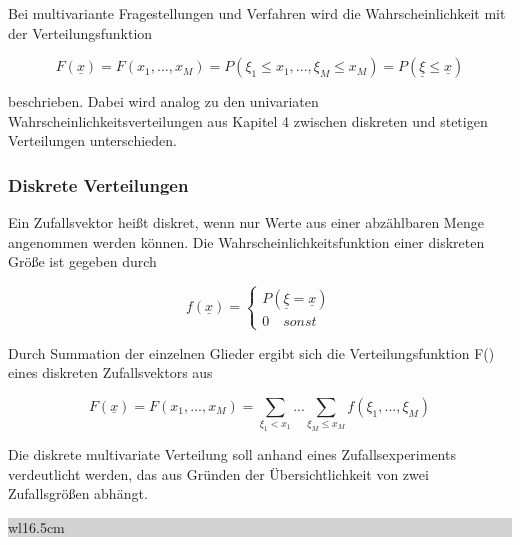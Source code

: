 \noindent Bei multivariante Fragestellungen und Verfahren wird die Wahrscheinlichkeit mit der Verteilungsfunktion


\begin{equation}\label{eq:eightthree}
F(\underline{x})=F(x_{1} ,...,x_{M})=P(\xi _{1} \le x_{1} ,...,\xi _{M} \le x_{M})=P(\underline{\xi }\le \underline{x})
\end{equation}

\noindent beschrieben. Dabei wird analog zu den univariaten Wahrscheinlichkeitsverteilungen aus Kapitel 4 zwischen diskreten und stetigen Verteilungen unterschieden.

\subsubsection{Diskrete Verteilungen}

\noindent Ein Zufallsvektor  hei{\ss}t diskret, wenn nur Werte aus einer abz\"{a}hlbaren Menge angenommen werden k\"{o}nnen. Die Wahrscheinlichkeitsfunktion einer diskreten Gr\"{o}{\ss}e  ist gegeben durch

\begin{equation}\label{eq:eightfour}
f(\underline{x})=\left\{\begin{array}{l} {P\left(\underline{\xi}=\underline{x}\right)} \\ 
{ 0 \quad sonst} \end{array}\right.
\end{equation}

\noindent Durch Summation der einzelnen Glieder ergibt sich die Verteilungsfunktion F() eines diskreten Zufallsvektors aus

\begin{equation}\label{eq:eightfive}
F\left(\underline{x}\right)=F\left(x_{1} ,...,x_{M} \right)=\sum _{\xi _{1} <x_{1} }...\sum _{\xi _{M} \le x_{M} }f\left(\xi _{1} ,...,\xi _{M} \right)
\end{equation}

\noindent Die diskrete multivariate Verteilung soll anhand eines Zufallsexperiments verdeutlicht werden, das aus Gr\"{u}nden der \"{U}bersichtlichkeit von zwei Zufallsgr\"{o}{\ss}en abh\"{a}ngt.\bigskip

\noindent
\colorbox{lightgray}{%
%
\renewcommand\arraystretch{0.6}%
\begin{tabular}{ wl{16.5cm} }
{\selectfont
{}}
\end{tabular}%
}\medskip


